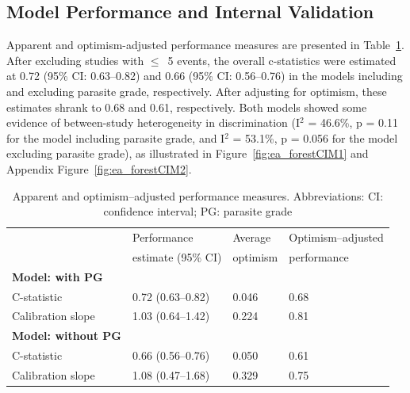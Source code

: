 \subsection{Model Performance and Internal Validation}

Apparent and optimism-adjusted performance measures are presented in Table~\ref{tab:ea-performance}. After excluding studies with $\leq$~5 events, the overall c-statistics were estimated at 0.72 (95\% CI: 0.63--0.82) and 0.66 (95\% CI: 0.56--0.76) in the models including and excluding parasite grade, respectively. After adjusting for optimism, these estimates shrank to 0.68 and 0.61, respectively. Both models showed some evidence of between-study heterogeneity in discrimination (I$^2$ = 46.6\%, p = 0.11 for the model including parasite grade, and I$^2$ = 53.1\%, p = 0.056 for the model excluding parasite grade), as illustrated in Figure~\ref{fig:ea_forestCIM1} and Appendix Figure~\ref{fig:ea_forestCIM2}.

\begin{table}[htbp]
  \begin{tabular}{@{}llll@{}}
    \toprule
                                   & Performance        & Average  & Optimism--adjusted \\
                                   & estimate (95\% CI) & optimism & performance        \\        \midrule
    \textbf{Model: with PG}        &                    &          &                    \\
    \hspace{1em} C-statistic       & 0.72 (0.63--0.82)  & 0.046    & 0.68               \\
    \hspace{1em} Calibration slope & 1.03 (0.64--1.42)  & 0.224    & 0.81               \\        \midrule
    \textbf{Model: without PG}     &                    &          &                    \\
    \hspace{1em} C-statistic       & 0.66 (0.56--0.76)  & 0.050    & 0.61               \\
    \hspace{1em} Calibration slope & 1.08 (0.47--1.68)  & 0.329    & 0.75               \\        \bottomrule
  \end{tabular}
  \caption{Apparent and optimism--adjusted performance measures. Abbreviations: CI: confidence interval; PG: parasite grade}
  \label{tab:ea-performance}
\end{table}

